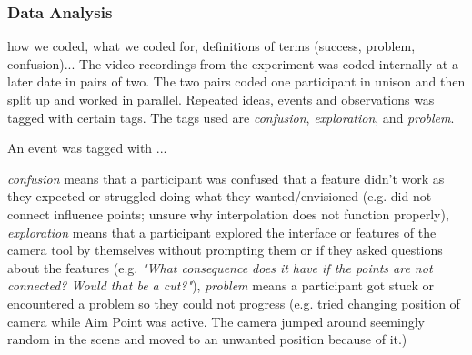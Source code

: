 \subsubsection{Data Analysis}
how we coded, what we coded for, definitions of terms (success, problem, confusion)...
The video recordings from the experiment was coded internally at a later date in pairs of two. The two pairs coded one participant in unison and then split up and worked in parallel. Repeated ideas, events and observations was tagged with certain tags. The tags used are \textit{confusion}, \textit{exploration}, and \textit{problem}.

An event was tagged with ...


\textit{confusion} means that a participant was confused that a feature didn't work as they expected or struggled doing what they wanted/envisioned (e.g. did not connect influence points; unsure why interpolation does not function properly), 
\textit{exploration} means that a participant explored the interface or features of the camera tool by themselves without prompting them or if they asked questions about the features (e.g. \textit{"What consequence does it have if the points are not connected? Would that be a cut?"}), 
\textit{problem} means a participant got stuck or encountered a problem so they could not progress (e.g. tried changing position of camera while Aim Point was active. The camera jumped around seemingly random in the scene and moved to an unwanted position because of it.)